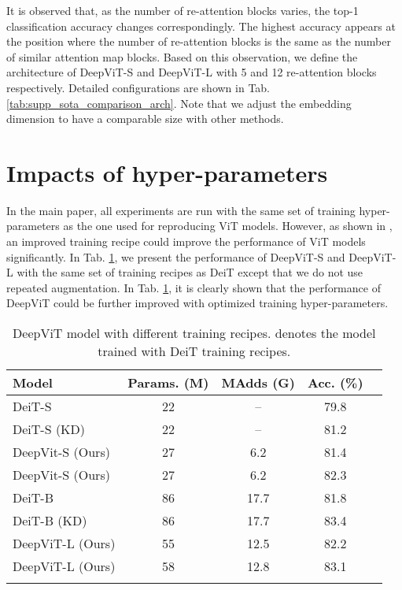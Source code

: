 \documentclass[10pt,twocolumn,letterpaper]{article}
\begin{document}
It is observed that, as the number of re-attention blocks varies, the top-1 classification accuracy changes correspondingly. The highest accuracy appears at the position where the number of re-attention blocks is the same as the number of similar attention map blocks. Based on this observation, we define the architecture of DeepViT-S and DeepViT-L with 5 and 12 re-attention blocks respectively. Detailed configurations are shown in Tab. \ref{tab:supp_sota_comparison_arch}. Note that we adjust the embedding dimension to have a comparable size with other methods.



\section{Impacts of hyper-parameters}
In the main paper, all experiments are run with the same set of training hyper-parameters as the one used for reproducing ViT models.
However, as shown in \cite{touvron2020training}, an improved training recipe could improve the performance of ViT models significantly. In Tab. \ref{tab:supp_comaprison_deit}, we present the performance of DeepViT-S and DeepViT-L with the same set of training recipes as DeiT except that we do not use repeated augmentation. 
In Tab. \ref{tab:supp_comaprison_deit}, it is clearly shown that the performance of DeepViT could be further improved with optimized training hyper-parameters. 

\begin{table}[h]
\footnotesize
\caption{DeepViT model with different training recipes.  denotes the model trained with DeiT \cite{touvron2020training} training recipes. }
\label{tab:supp_comaprison_deit}
\centering
\begin{tabular}{lcccc}
\toprule
\bf Model
&\bf Params. (M)
&\bf MAdds (G)
&\bf Acc. (\%)
\\ \midrule DeiT-S \cite{touvron2020training} & 22 & -- & 79.8 \\
 DeiT-S (KD) \cite{touvron2020training} & 22 & -- & 81.2 \\
DeepVit-S (Ours) & 27  & 6.2 & 81.4 \\ 
  DeepVit-S (Ours) & 27  & 6.2 & 82.3 \\ 
 \midrule
 DeiT-B \cite{touvron2020training} & 86 & 17.7 & 81.8 \\
 DeiT-B (KD) \cite{touvron2020training} & 86 & 17.7 & 83.4 \\
DeepViT-L (Ours) & 55  & 12.5 & 82.2 \\ 
 DeepViT-L (Ours) & 58  & 12.8 & 83.1 \\ 
\bottomrule
\vspace{-5mm}
\end{tabular}
\end{table}
\end{document}
